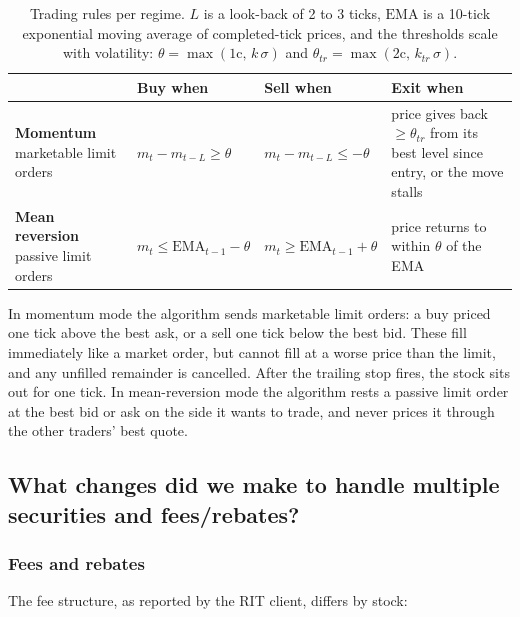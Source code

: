 \documentclass{article}
\begin{document}
\begin{table}[H]
\centering
\renewcommand{\arraystretch}{1.3}
\begin{tabular}{p{2.6cm}p{4.3cm}p{4.3cm}p{4.0cm}}
\toprule
 & \textbf{Buy when} & \textbf{Sell when} & \textbf{Exit when} \\
\midrule
\textbf{Momentum} \newline marketable limit orders &
$m_t - m_{t-L} \ge \theta$ &
$m_t - m_{t-L} \le -\theta$ &
price gives back $\ge \theta_{tr}$ from its best level since entry, or the move stalls \\
\textbf{Mean reversion} \newline passive limit orders &
$m_t \le \text{EMA}_{t-1} - \theta$ &
$m_t \ge \text{EMA}_{t-1} + \theta$ &
price returns to within $\theta$ of the EMA \\
\bottomrule
\end{tabular}
\caption{Trading rules per regime. $L$ is a look-back of 2 to 3 ticks, $\text{EMA}$ is a 10-tick exponential moving average of completed-tick prices, and the thresholds scale with volatility: $\theta = \max(1\text{c},\, k\,\sigma)$ and $\theta_{tr} = \max(2\text{c},\, k_{tr}\,\sigma)$.}
\label{tab:algo2e_rules}
\end{table}

\noindent In momentum mode the algorithm sends marketable limit orders: a buy priced one tick above the best ask, or a sell one tick below the best bid. These fill immediately like a market order, but cannot fill at a worse price than the limit, and any unfilled remainder is cancelled. After the trailing stop fires, the stock sits out for one tick. In mean-reversion mode the algorithm rests a passive limit order at the best bid or ask on the side it wants to trade, and never prices it through the other traders' best quote.

\subsection{What changes did we make to handle multiple securities and fees/rebates?}

\subsubsection*{Fees and rebates}

The fee structure, as reported by the RIT client, differs by stock:
\end{document}
